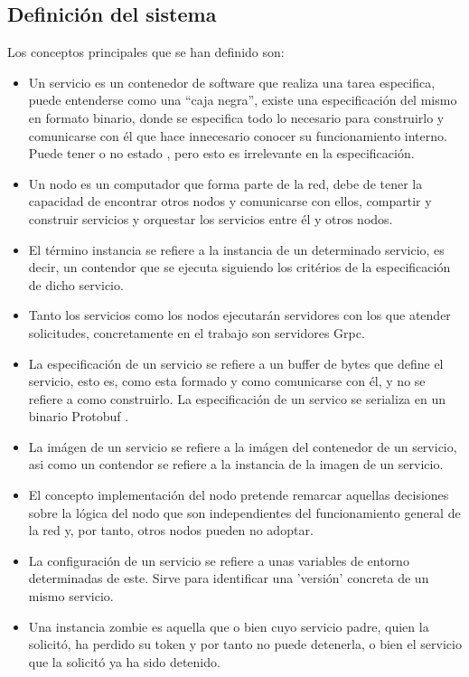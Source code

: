 \documentclass[11pt]{article}
\begin{document}
		\subsection{Definición del sistema}
			Los conceptos principales que se han definido son:
			\begin{itemize}
				\item Un servicio es un contenedor de software que realiza una tarea especifica, puede entenderse como una ``caja negra'', existe una especificación del mismo en 
					formato binario, donde se especifica todo lo necesario para construirlo y comunicarse con él que hace innecesario conocer su funcionamiento interno. Puede tener
					o no estado \cite{red_hat}, pero esto es irrelevante en la especificación.
	
				\item Un nodo es un computador que forma parte de la red, debe de tener la capacidad de encontrar otros nodos y comunicarse con ellos, compartir y construir servicios
					y orquestar los servicios entre él y otros nodos.
	
				\item El término instancia se refiere a la instancia de un determinado servicio, es decir, un contendor que se ejecuta siguiendo los critérios de la especificación de dicho servicio.
	
				\item Tanto los servicios como los nodos ejecutarán servidores con los que atender solicitudes, concretamente en el trabajo son servidores Grpc. 
	
				\item La especificación de un servicio se refiere a un buffer de bytes que define el servicio, esto es, como esta formado y como comunicarse con él, y no se refiere a como construirlo.
					La especificación de un servico se serializa en un binario Protobuf \cite{google}.
				
				\item La imágen de un servicio se refiere a la imágen del contenedor de un servicio, asi como un contendor se refiere a la instancia de la imagen de un servicio.
				
				\item El concepto implementación del nodo pretende remarcar aquellas decisiones sobre la lógica del nodo que son independientes del funcionamiento general de la red y,
					por tanto, otros nodos pueden no adoptar.

				\item La configuración de un servicio se refiere a unas variables de entorno determinadas de este. Sirve para identificar una 'versión' concreta de un mismo servicio.
				
				\item Una instancia zombie es aquella que o bien cuyo servicio padre, quien la solicitó, ha perdido su token y por tanto no puede detenerla, o bien el servicio que la solicitó ya ha sido detenido.
			\end{itemize}
	
\end{document}
